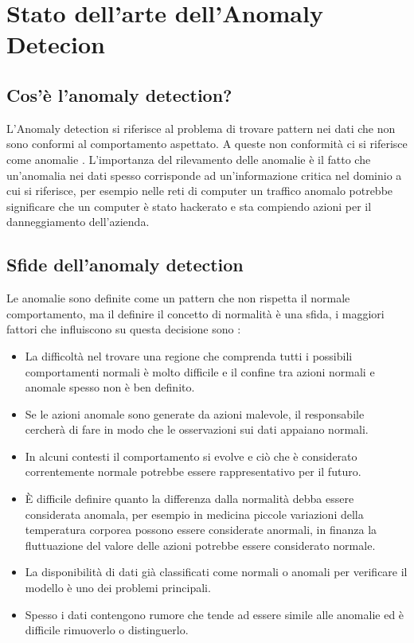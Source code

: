 
\chapter{Stato dell'arte dell'Anomaly Detecion}

\section{Cos'è l'anomaly detection?}


L'Anomaly detection si riferisce al problema di trovare pattern nei dati che non sono conformi al comportamento aspettato. A queste non conformità ci si riferisce come anomalie \cite{anomaly_detection_survey_3}. L'importanza del rilevamento delle anomalie è il fatto che un'anomalia nei dati spesso corrisponde ad un'informazione critica nel dominio a cui si riferisce, per esempio nelle reti di computer un traffico anomalo potrebbe significare che un computer è stato hackerato e sta compiendo azioni per il danneggiamento dell'azienda.

\section{Sfide dell'anomaly detection}

Le anomalie sono definite come un pattern che non rispetta il normale comportamento, ma il definire il concetto di normalità è una sfida, i maggiori fattori che influiscono su questa decisione sono \cite{anomaly_detection_survey_3}:

\begin{itemize}
    \item La difficoltà nel trovare una regione che comprenda tutti i possibili comportamenti normali è molto difficile e il confine tra azioni normali e anomale spesso non è ben definito.
    \item Se le azioni anomale sono generate da azioni malevole, il responsabile cercherà di fare in modo che le osservazioni sui dati appaiano normali.
    \item In alcuni contesti il comportamento si evolve e ciò che è considerato correntemente normale potrebbe essere rappresentativo per il futuro.
    \item È difficile definire quanto la differenza dalla normalità debba essere considerata anomala, per esempio in medicina piccole variazioni della temperatura corporea possono essere considerate anormali, in finanza la fluttuazione del valore delle azioni potrebbe essere considerato normale.
    \item La disponibilità di dati già classificati come normali o anomali per verificare il modello è uno dei problemi principali.
    \item Spesso i dati contengono rumore che tende ad essere simile alle anomalie ed è difficile rimuoverlo o distinguerlo.
\end{itemize}

